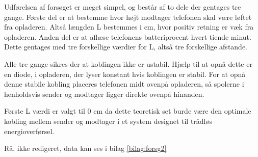 Udførelsen af forsøget er meget simpel, og består af to dele der gentages tre gange. Første del er at bestemme hvor højt modtager telefonen skal være løftet fra opladeren. Altså længden L bestemmes i cm, hvor positiv retning er væk fra opladeren. Anden del er at aflæse telefonens batteriprocent hvert tiende minut. Dette gentages med tre forskellige værdier for L, altså tre forskellige afstande.

Alle tre gange sikres der at koblingen ikke er ustabil. Hjælp til at opnå dette er en diode, i opladeren, der lyser konstant hvis koblingen er stabil. For at opnå denne stabile kobling placeres telefonen midt ovenpå opladeren, så spolerne i henholdsvis sender og modtager ligger direkte ovenpå hinanden.

Første L værdi er valgt til 0 cm da dette teoretisk set burde være den optimale kobling mellem sender og modtager i et system designet til trådløs energioverførsel. 

Rå, ikke redigeret, data kan ses i bilag \ref{bilag:forsg2}
